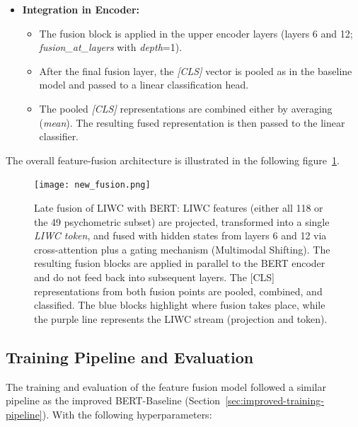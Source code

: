 \begin{itemize}
    \item \textbf{Integration in Encoder:}
    \begin{itemize}
        \item The fusion block is applied in the upper encoder layers (layers 6 and 12; \textit{fusion\_at\_layers} with \textit{depth}=1).
        \item After the final fusion layer, the \textit{[CLS]} vector is pooled as in the baseline model and passed to a linear classification head.
        \item  The pooled \textit{[CLS]} representations are combined either by averaging (\textit{mean}). The resulting fused representation is then passed to the linear classifier.

    \end{itemize}
\end{itemize}
    
    

The overall feature-fusion architecture is illustrated in the following figure~\ref{fig:liwc-bert-fusion}.

\begin{figure}[H]
    \centering
    \texttt{[image: new\_fusion.png]}
    \caption[Feature Fusion Architecture]{Late fusion of LIWC with BERT: LIWC features (either all 118 or the 49 psychometric subset) are projected, transformed into a single \emph{LIWC token}, and fused with hidden states from layers 6 and 12 via cross-attention plus a gating mechanism (Multimodal Shifting). The resulting fusion blocks are applied in parallel to the BERT encoder and do not feed back into subsequent layers. The [CLS] representations from both fusion points are pooled, combined, and classified. The \textcolor{blue!70!black}{blue blocks} highlight where fusion takes place, while the \textcolor{violet!70!black}{purple line} represents the LIWC stream (projection and token).}
\label{fig:liwc-bert-fusion}

\end{figure}

\subsection{Training Pipeline and Evaluation}

The training and evaluation of the feature fusion model followed a similar pipeline as the improved BERT-Baseline (Section~\ref{sec:improved-training-pipeline}). With the following hyperparameters:

